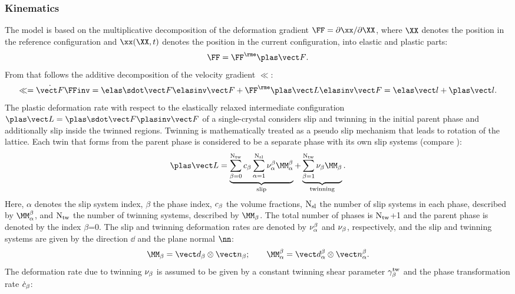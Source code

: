 \subsubsection{Kinematics}
  The model is based on the multiplicative decomposition of the deformation gradient $\FF=\partial \xx / \partial \XX$, where $\XX$ denotes the position in the reference configuration and $\xx(\XX,t)$ denotes the position in the current configuration, into elastic and plastic parts\supercite{kroener1959allgemeine,lee1969elastic-plastic}:
  \begin{equation}
      \FF = \FFe \FFp.
      \label{eq:DecompF}
  \end{equation}
  From that follows the additive decomposition of the velocity gradient $\ll$:
  \begin{equation}
          \ll = \FFdot \FFinv = \FFedot\FFeinv + \FFe \LLp \FFeinv = \lle + \llp.
  \end{equation}
  The plastic deformation rate with respect to the elastically relaxed intermediate configuration \mbox{$\LLp=\FFpdot\FFpinv$} of a single-crystal considers slip and twinning in the initial parent phase and additionally slip inside the twinned regions. Twinning is mathematically treated as a pseudo slip mechanism that leads to rotation of the lattice. Each twin that forms from the parent phase is considered to be a separate phase with its own slip systems (compare ):   
  \begin{equation}
    \LLp = \underbrace{\sumbONtw \cb \sumaNsl \nuab \MMab}_{\text{slip}} + \underbrace{\sumbNtw \nub \MMb}_{\text{twinning}}.
    \label{eq:LLp}
  \end{equation}
  Here, $\alpha$ denotes the slip system index, $\beta$ the phase index, $c_{\beta}$ the volume fractions, ${\rm N_{sl}}$ the number of slip systems in each phase, described by $\MMab$, and ${\rm N_{tw}}$ the number of twinning systems, described by $\MMb$. The total number of phases is ${\rm N_{tw}}$+1 and the parent phase is denoted by the index $\beta$=0. The slip and twinning deformation rates are denoted by $\nu_{\alpha}^{\beta}$ and $\nu_{\beta}$, respectively, and the slip and twinning systems are given by the direction $\dd$ and the plane normal $\nn$: 
  \begin{equation}
      \MMb = \ddb \otimes \nnb; \qquad \MMab = \ddab \otimes \nnab.
      \label{eq:MM}
  \end{equation}
  The deformation rate due to twinning $\nu_{\beta}$ is assumed to be given by a constant twinning shear parameter $\gamma^{\rm tw}_{\beta}$ and the phase transformation rate $\dot{c}_{\beta}$:
